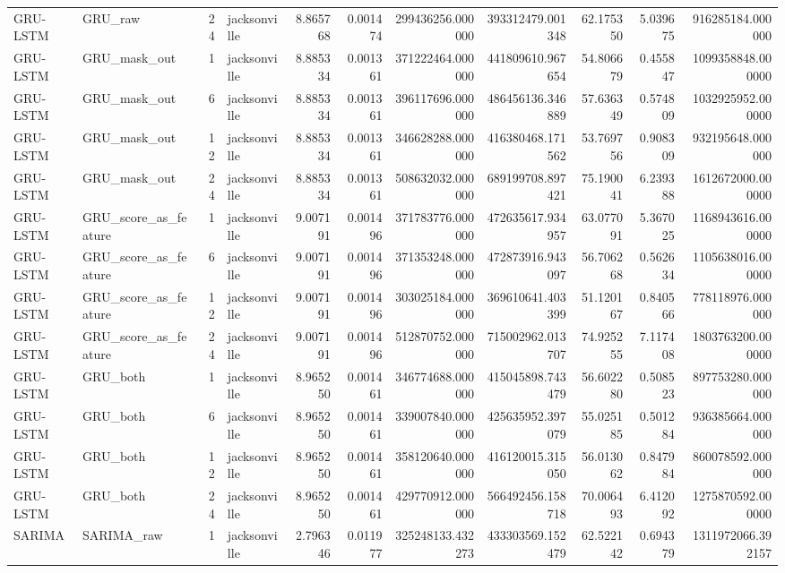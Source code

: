 \begin{longtable}{llrlrrrrrrr}
GRU-LSTM & GRU\_raw & 24 & jacksonville & 8.865768 & 0.001474 & 299436256.000000 & 393312479.001348 & 62.175350 & 5.039675 & 916285184.000000 \\
GRU-LSTM & GRU\_mask\_out & 1 & jacksonville & 8.885334 & 0.001361 & 371222464.000000 & 441809610.967654 & 54.806679 & 0.455847 & 1099358848.000000 \\
GRU-LSTM & GRU\_mask\_out & 6 & jacksonville & 8.885334 & 0.001361 & 396117696.000000 & 486456136.346889 & 57.636349 & 0.574809 & 1032925952.000000 \\
GRU-LSTM & GRU\_mask\_out & 12 & jacksonville & 8.885334 & 0.001361 & 346628288.000000 & 416380468.171562 & 53.769756 & 0.908309 & 932195648.000000 \\
GRU-LSTM & GRU\_mask\_out & 24 & jacksonville & 8.885334 & 0.001361 & 508632032.000000 & 689199708.897421 & 75.190041 & 6.239388 & 1612672000.000000 \\
GRU-LSTM & GRU\_score\_as\_feature & 1 & jacksonville & 9.007191 & 0.001496 & 371783776.000000 & 472635617.934957 & 63.077091 & 5.367025 & 1168943616.000000 \\
GRU-LSTM & GRU\_score\_as\_feature & 6 & jacksonville & 9.007191 & 0.001496 & 371353248.000000 & 472873916.943097 & 56.706268 & 0.562634 & 1105638016.000000 \\
GRU-LSTM & GRU\_score\_as\_feature & 12 & jacksonville & 9.007191 & 0.001496 & 303025184.000000 & 369610641.403399 & 51.120167 & 0.840566 & 778118976.000000 \\
GRU-LSTM & GRU\_score\_as\_feature & 24 & jacksonville & 9.007191 & 0.001496 & 512870752.000000 & 715002962.013707 & 74.925255 & 7.117408 & 1803763200.000000 \\
GRU-LSTM & GRU\_both & 1 & jacksonville & 8.965250 & 0.001461 & 346774688.000000 & 415045898.743479 & 56.602280 & 0.508523 & 897753280.000000 \\
GRU-LSTM & GRU\_both & 6 & jacksonville & 8.965250 & 0.001461 & 339007840.000000 & 425635952.397079 & 55.025185 & 0.501284 & 936385664.000000 \\
GRU-LSTM & GRU\_both & 12 & jacksonville & 8.965250 & 0.001461 & 358120640.000000 & 416120015.315050 & 56.013062 & 0.847984 & 860078592.000000 \\
GRU-LSTM & GRU\_both & 24 & jacksonville & 8.965250 & 0.001461 & 429770912.000000 & 566492456.158718 & 70.006493 & 6.412092 & 1275870592.000000 \\
SARIMA & SARIMA\_raw & 1 & jacksonville & 2.796346 & 0.011977 & 325248133.432273 & 433303569.152479 & 62.522142 & 0.694379 & 1311972066.392157 \\

\end{longtable}
